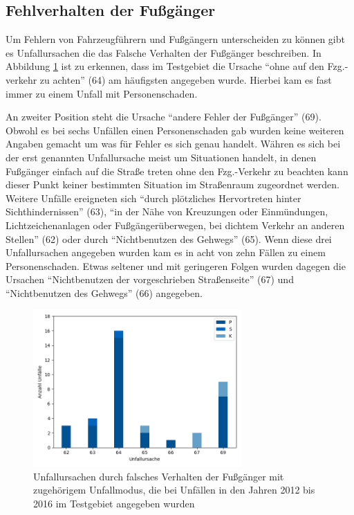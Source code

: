 \subsection{Fehlverhalten der Fußgänger}
Um Fehlern von Fahrzeugführern und Fußgängern unterscheiden zu können gibt es Unfallursachen die das Falsche Verhalten der Fußgänger beschreiben. In Abbildung \ref{fig:Fehlverhalten_Fussgaenger} ist zu erkennen, dass im Testgebiet die Ursache \enquote{ohne auf den Fzg.-verkehr zu achten} (64) am häufigsten angegeben wurde. Hierbei kam es fast immer zu einem Unfall mit Personenschaden.

An zweiter Position steht die Ursache \enquote{andere Fehler der Fußgänger} (69). Obwohl es bei sechs Unfällen einen Personenschaden gab wurden keine weiteren Angaben gemacht um was für Fehler es sich genau handelt. Währen es sich bei der erst genannten Unfallursache meist um Situationen handelt, in denen Fußgänger einfach auf die Straße treten ohne den Fzg.-Verkehr zu beachten kann dieser Punkt keiner bestimmten Situation im Straßenraum zugeordnet werden. Weitere Unfälle ereigneten sich \enquote{durch plötzliches Hervortreten hinter Sichthindernissen} (63), \enquote{in der Nähe von Kreuzungen oder Einmündungen, Lichtzeichenanlagen oder Fußgängerüberwegen, bei dichtem Verkehr an anderen Stellen} (62) oder durch \enquote{Nichtbenutzen des Gehwegs} (65). Wenn diese drei Unfallursachen angegeben wurden kam es in acht von zehn Fällen zu einem Personenschaden. Etwas seltener und mit geringeren Folgen wurden dagegen die Ursachen \enquote{Nichtbenutzen der vorgeschrieben Straßenseite} (67) und \enquote{Nichtbenutzen des Gehwegs} (66) angegeben.

\begin{savenotes}
	\begin{figure}[H]
		\centering
		\includegraphics[width=8cm,height=6cm]{figures/Urs_Fussgaenger}
		\caption[Unfallursachen durch falsches Verhalten der Fußgänger mit zugehörigem Unfallmodus, die bei Unfällen in den Jahren 2012 bis 2016 im Testgebiet angegeben wurden]{Unfallursachen durch falsches Verhalten der Fußgänger mit zugehörigem Unfallmodus, die bei Unfällen in den Jahren 2012 bis 2016 im Testgebiet angegeben wurden}\label{fig:Fehlverhalten_Fussgaenger}
	\end{figure}
\end{savenotes}


